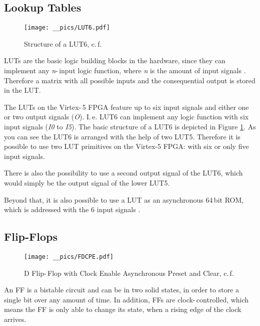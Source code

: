 \subsection{Lookup Tables}

\begin{figure}[h]
	\center
		\texttt{[image: \_\_pics/LUT6.pdf]}
		\caption{Structure of a LUT6, c.\,f. \cite{Xilinx2010c}}
		\label{pic:lut6}	
	\end{figure} 

\acp{LUT} are the basic logic building blocks in the hardware, since they can implement any \textit{n}-\,input logic function, where \textit{n} is the amount of input signals \cite{Xilinx2010c}. Therefore a matrix with all possible inputs and the consequential output is stored in the \ac{LUT}.

The \acp{LUT} on the Virtex-\,5 \ac{FPGA} feature up to six input signals and either one or two output signals (\textit{O}). I.\,e. \ac{LUT6}  can implement any logic function with six input signals (\textit{I0} to \textit{I5}). The basic structure of a \ac{LUT6} is depicted in Figure \ref{pic:lut6}. As you can see the \ac{LUT6} is arranged with the help of two \ac{LUT5}. Therefore it is possible to use two \ac{LUT} primitives on the Virtex-5 \ac{FPGA}: with six or only five input signals.

There is also the possibility to use a second output signal of the \ac{LUT6}, which would simply be the output signal of the lower \ac{LUT5}.

Beyond that, it is also possible to use a \ac{LUT} as an asynchronous 64\,bit ROM, which is addressed with the 6 input signals \cite{Xilinx2010c}.
	
	
\subsection{Flip-Flops}

	\begin{figure}[h]
		\center
		\texttt{[image: \_\_pics/FDCPE.pdf]}
		\caption{D Flip-\,Flop with Clock Enable Asynchronous Preset and Clear, c.\,f. \cite{Xilinx2010c}}
		\label{pic:fdcpe}	
	\end{figure}

An \ac{FF} is a bistable circuit and can be in two solid states, in order to store a single bit over any amount of time. In addition, \acp{FF} are clock-\,controlled, which means the \ac{FF} is only able to change its state, when a rising edge of the clock arrives. 

